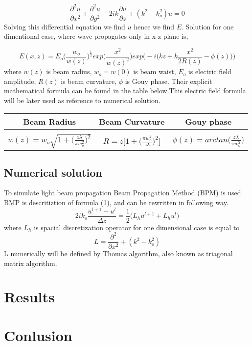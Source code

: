 \documentclass{article}
\begin{document}
	\begin{equation}
	\frac{\partial^2 u}{\partial x^2}+ \frac{\partial^2 u}{\partial y^2} - 2ik\frac{\partial u}{\partial z}+(k^2-k_o^2)u=0
	\end{equation}
	Solving this differential equation we find $u$ hence we find $E$. Solution for one dimentional case, where wave propagates only in x-z plane is,
	
	\[E(x,z)=E_o\bigg(\frac{w_o}{w(z)}\bigg)^{\frac{1}{2}}exp\bigg(\frac{x^2}{w(z)^2}\bigg)exp\bigg(-i\Big(kz+k\frac{x^2}{2R(z)}-\phi(z)\Big)\bigg)\]
	where
	$w(z)$ is beam radius, $w_o = w(0)$ is beam waist, $E_o$ is electric field amplitude, $R(z)$ is beam curvature, $\phi$ is Gouy phase. Their explicit mathematical formula can be found in the table below.This electric field formula will be later used as reference to numerical solution.
	

	\begin{table}[h!]
		\begin{center}
			\label{tab:table1}
			\begin{tabular}{c| c| c} %
				\textbf{Beam Radius} & \textbf{Beam Curvature} & \textbf{Gouy phase}\\
				\hline
				&&\\
				$w(z)= w_o\sqrt{1+\Big(\frac{z\lambda}{\pi w_o^2}\Big)^2}$ & $R=z\bigg[1+\Big(\frac{\pi w_o^2}{z\lambda}\Big)^2\bigg]$ & $\phi(z)=arctan\Big(\frac{z\lambda}{\pi w_o^2}\Big)$\\
			\end{tabular}
		\end{center}
	\end{table}
	
	\subsection{Numerical solution}
	To simulate light beam propagation Beam Propagation Method (BPM) is used. BMP is descritiztion of formula (1), and can be rewritten in following way.
	\[2ik_o\frac{u^{l+1}-u^l}{\Delta z}=\frac{1}{2}\bigg(L_hu^{l+1}+L_hu^l\bigg)\]
	where $L_h$ is spacial discretization operator for one dimensional case is equal to
	\[L= \frac{\partial^2 }{\partial x^2}+(k^2-k_o^2)\]
	L numerically will be defined by Thomas algorithm, also known as triagonal matrix algorithm.
	\section{Results}
	\section{Conlusion}
\end{document}
